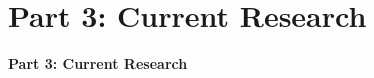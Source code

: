 \documentclass[aspectratio=169, 9pt, handout]{beamer}
\begin{document}
\section{Part 3: Current Research}

\begin{frame}[t]
	\textcolor{uscgold}{
		\Large {\bf Part 3: Current Research}
	}
\end{frame}
\end{document}

